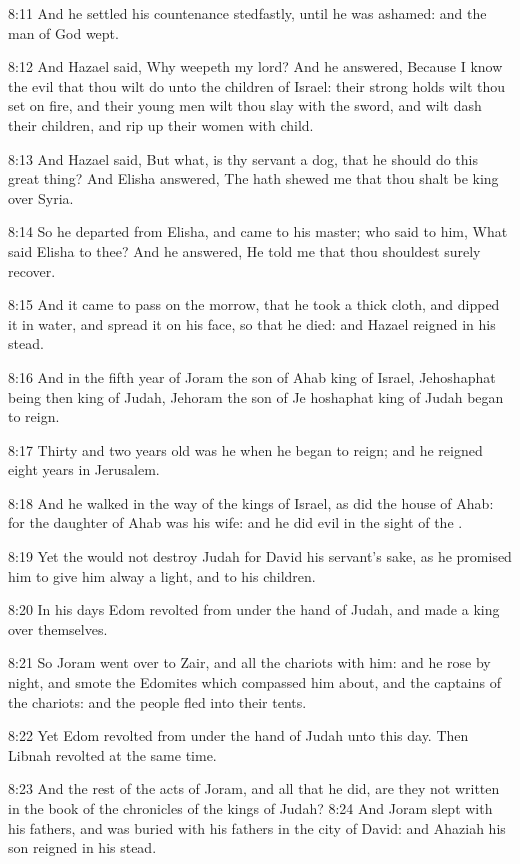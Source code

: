 8:11 And he settled his countenance stedfastly, until he was ashamed:
and the man of God wept.

8:12 And Hazael said, Why weepeth my lord? And he answered, Because I
know the evil that thou wilt do unto the children of Israel: their
strong holds wilt thou set on fire, and their young men wilt thou slay
with the sword, and wilt dash their children, and rip up their women
with child.

8:13 And Hazael said, But what, is thy servant a dog, that he should
do this great thing? And Elisha answered, The \LORD hath shewed me that
thou shalt be king over Syria.

8:14 So he departed from Elisha, and came to his master; who said to
him, What said Elisha to thee? And he answered, He told me that thou
shouldest surely recover.

8:15 And it came to pass on the morrow, that he took a thick cloth,
and dipped it in water, and spread it on his face, so that he died:
and Hazael reigned in his stead.

8:16 And in the fifth year of Joram the son of Ahab king of Israel,
Jehoshaphat being then king of Judah, Jehoram the son of Je hoshaphat
king of Judah began to reign.

8:17 Thirty and two years old was he when he began to reign; and he
reigned eight years in Jerusalem.

8:18 And he walked in the way of the kings of Israel, as did the house
of Ahab: for the daughter of Ahab was his wife: and he did evil in the
sight of the \LORD.

8:19 Yet the \LORD would not destroy Judah for David his servant's
sake, as he promised him to give him alway a light, and to his
children.

8:20 In his days Edom revolted from under the hand of Judah, and made
a king over themselves.

8:21 So Joram went over to Zair, and all the chariots with him: and he
rose by night, and smote the Edomites which compassed him about, and
the captains of the chariots: and the people fled into their tents.

8:22 Yet Edom revolted from under the hand of Judah unto this day.
Then Libnah revolted at the same time.

8:23 And the rest of the acts of Joram, and all that he did, are they
not written in the book of the chronicles of the kings of Judah?  8:24
And Joram slept with his fathers, and was buried with his fathers in
the city of David: and Ahaziah his son reigned in his stead.

